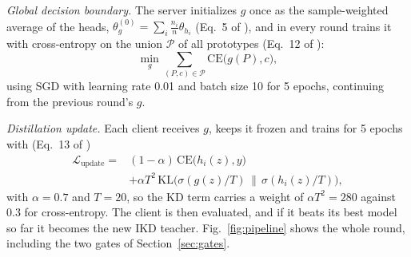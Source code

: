 \documentclass[conference]{IEEEtran}
\begin{document}
\textit{Global decision boundary.} The server initializes $g$ once as the sample-weighted average of the heads, $\theta_g^{(0)}=\sum_i \frac{n_i}{n}\theta_{h_i}$ (Eq.~5 of \cite{zhang2025gdbd}), and in every round trains it with cross-entropy on the union $\mathcal{P}$ of all prototypes (Eq.~12 of \cite{zhang2025gdbd}):
\begin{equation}
\min_{g} \sum_{(P,c)\in\mathcal{P}} \mathrm{CE}\big(g(P), c\big),
\label{eq:gtrain}
\end{equation}
using SGD with learning rate 0.01 and batch size 10 for 5 epochs, continuing from the previous round's $g$.

\textit{Distillation update.} Each client receives $g$, keeps it frozen and trains for 5 epochs with (Eq.~13 of \cite{zhang2025gdbd})
\begin{equation}
\begin{split}
\mathcal{L}_{\text{update}} = {}&(1-\alpha)\,\mathrm{CE}\big(h_i(z),y\big)\\
&+ \alpha T^2\,\mathrm{KL}\big(\sigma(g(z)/T)\,\big\|\,\sigma(h_i(z)/T)\big),
\end{split}
\label{eq:update}
\end{equation}
with $\alpha=0.7$ and $T=20$, so the KD term carries a weight of $\alpha T^2=280$ against $0.3$ for cross-entropy. The client is then evaluated, and if it beats its best model so far it becomes the new IKD teacher. Fig.~\ref{fig:pipeline} shows the whole round, including the two gates of Section~\ref{sec:gates}.
\end{document}
